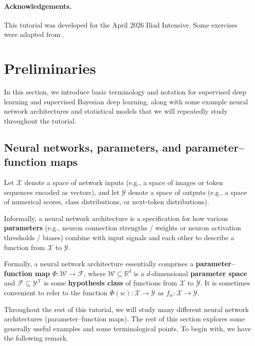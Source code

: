 \documentclass[11pt]{article}
\newcommand{\R}{\mathbb{R}}
\newcommand{\X}{\mathcal{X}}
\newcommand{\Y}{\mathcal{Y}}
\newcommand{\W}{\mathcal{W}}
\newcommand{\F}{\mathcal{F}}
\begin{document}
\paragraph{Acknowledgements.}

This tutorial was developed for the April 2026 Iliad Intensive.
Some exercises were adapted from \citet{Furman2024}.

\clearpage
\section{Preliminaries}
\label{sec:prelims}

In this section, we introduce basic terminology and notation for supervised
deep learning and supervised Bayesian deep learning, along with some example
neural network architectures and statistical models that we will repeatedly
study throughout the tutorial.

\subsection{Neural networks, parameters, and parameter--function maps}

Let $\X$ denote a space of network inputs (e.g., a space of images or token
sequences encoded as vectors), and let $\Y$ denote a space of outputs (e.g., a
space of numerical scores, class distributions, or next-token distributions).

Informally, a neural network architecture is a specification for how various
\textbf{parameters} (e.g., neuron connection strengths / weights or neuron
activation thresholds / biases) combine with input signals and each other to
describe a function from $\X$ to $\Y$.

Formally, a neural network architecture essentially comprises a
\textbf{parameter--function map}
    $\Phi : \W \to \F$, where
$\W \subseteq \R^d$ is a $d$-dimensional \textbf{parameter space} and 
$\F \subseteq \Y^\X$ is some \textbf{hypothesis class} of functions from $\X$
to $\Y$.
%
It is sometimes convenient to refer to the function $\Phi(w) : \X \to \Y$ as
$f_w : \X \to \Y$.

Throughout the rest of this tutorial, we will study many different neural
network architectures (parameter--function maps). The rest of this section
explores some generally useful examples and some terminological points. To
begin with, we have the following remark.
\end{document}
